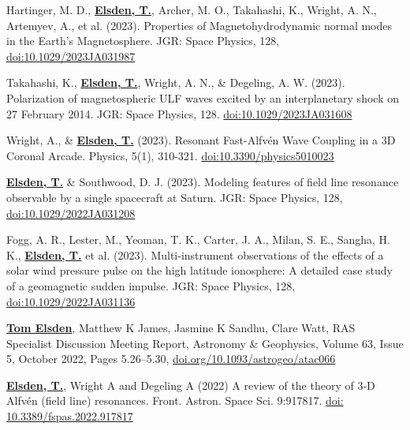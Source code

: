 \documentclass[11pt,a4paper]{article} %
\newcommand\vs{\vspace{-0.25cm}}
\begin{document}
\begin{etaremune}
\item Hartinger, M. D., \underline{\textbf{Elsden, T.}}, Archer, M. O., Takahashi, K., Wright, A. N., Artemyev, A., et al. (2023). Properties of Magnetohydrodynamic normal modes in the Earth's Magnetosphere. JGR: Space Physics, 128, \href{https://doi.org/10.1029/2023JA031987}{doi:10.1029/2023JA031987}

\vs
\item Takahashi, K., \underline{\textbf{Elsden, T.}}, Wright, A. N., \& Degeling, A. W. (2023). Polarization of magnetospheric ULF waves excited by an interplanetary shock on 27 February 2014. JGR: Space Physics, 128. \href{https://doi.org/10.1029/2023JA031608}{doi:10.1029/2023JA031608}

\vs
\item Wright, A., \& \underline{\textbf{Elsden, T.}} (2023). Resonant Fast-Alfvén Wave Coupling in a 3D Coronal Arcade. Physics, 5(1), 310-321. \href{https://doi.org/10.3390/physics5010023}{doi:10.3390/physics5010023}

\vs
\item \underline{\textbf{Elsden, T.}} \& Southwood, D. J. (2023). Modeling features of field line resonance observable by a single spacecraft at Saturn. JGR: Space Physics, 128, \href{https://doi.org/10.1029/2022JA031208}{doi:10.1029/2022JA031208}

\vs
\item Fogg, A. R., Lester, M., Yeoman, T. K., Carter, J. A., Milan, S. E., Sangha, H. K.,  \underline{\textbf{Elsden, T.}} et al. (2023). Multi-instrument observations of the effects of a solar wind pressure pulse on the high latitude ionosphere: A detailed case study of a geomagnetic sudden impulse. JGR: Space Physics, 128, \href{https://doi.org/10.1029/2022JA031136}{doi:10.1029/2022JA031136}

\vs
\item \underline{\textbf{Tom Elsden}}, Matthew K James, Jasmine K Sandhu, Clare Watt, RAS Specialist Discussion Meeting Report, Astronomy \& Geophysics, Volume 63, Issue 5, October 2022, Pages 5.26–5.30, \newline \href{https://doi.org/10.1093/astrogeo/atac066}{doi.org/10.1093/astrogeo/atac066}

\vs
\item  \underline{\textbf{Elsden, T.}}, Wright A and Degeling A (2022) A review of the theory of 3‐D Alfvén (field line) resonances. Front. Astron. Space Sci. 9:917817. \href{https://doi.org/10.3389/fspas.2022.917817}{doi: 10.3389/fspas.2022.917817}


\end{etaremune}
\end{document}
